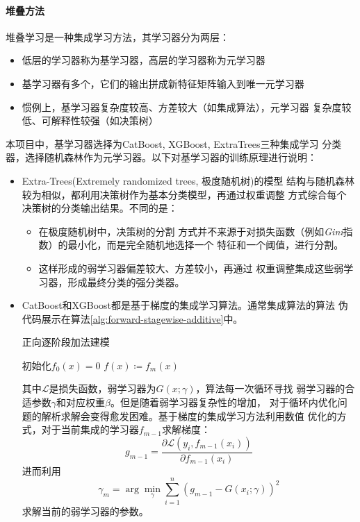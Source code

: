 \paragraph{堆叠方法}
堆叠学习是一种集成学习方法，其学习器分为两层：
\begin{itemize}
    \item 低层的学习器称为基学习器，高层的学习器称为元学习器
    \item 基学习器有多个，它们的输出拼成新特征矩阵输入到唯一元学习器
    \item 惯例上，基学习器复杂度较高、方差较大（如集成算法），元学习器
    复杂度较低、可解释性较强（如决策树）
\end{itemize}
本项目中，基学习器选择为CatBoost, XGBoost, ExtraTrees三种集成学习
分类器，选择随机森林作为元学习器。以下对基学习器的训练原理进行说明：
\begin{itemize}
    \item Extra-Trees(Extremely randomized trees, 极度随机树)的模型
    结构与随机森林较为相似，都利用决策树作为基本分类模型，再通过权重调整
    方式综合每个决策树的分类输出结果。不同的是：
    \begin{itemize}
        \item 在极度随机树中，决策树的分割
        方式并不来源于对损失函数（例如\textit{Gini}指数）的最小化，而是完全随机地选择一个
        特征和一个阈值，进行分割。
        \item 这样形成的弱学习器偏差较大、方差较小，再通过
        权重调整集成这些弱学习器，形成最终分类的强分类器。
    \end{itemize}
    \item CatBoost和XGBoost都是基于梯度的集成学习算法。通常集成算法的算法
    伪代码展示在算法\ref{alg:forward-stagewise-additive}中。
    \begin{algorithm}[ht]
        \caption{正向逐阶段加法建模}
        \DontPrintSemicolon
        \SetAlgoLined
        \BlankLine
        初始化$f_0(x)=0$\;
        $f(x)\coloneqq f_{m}(x)$\;
    \label{alg:forward-stagewise-additive}
    \end{algorithm}
    其中$\mathcal{L}$是损失函数，弱学习器为$G(x;\gamma)$，算法每一次循环寻找
    弱学习器的合适参数$\gamma$和对应权重$\beta$。但是随着弱学习器复杂性的增加，
    对于循环内优化问题的解析求解会变得愈发困难。基于梯度的集成学习方法利用数值
    优化的方式，对于当前集成的学习器$f_{m-1}$求解梯度：
    \begin{equation*}
        g_{m-1} = \frac{\partial \mathcal{L}(y_i,f_{m-1}(x_i))}{\partial f_{m-1}(x_i)}
    \end{equation*}
    进而利用
    \begin{equation*}
    \gamma_m = \arg\min_{\gamma} \sum_{i=1}^{n}(g_{m-1}-G(x_i;\gamma))^2
    \end{equation*}
    求解当前的弱学习器的参数。
\end{itemize}

